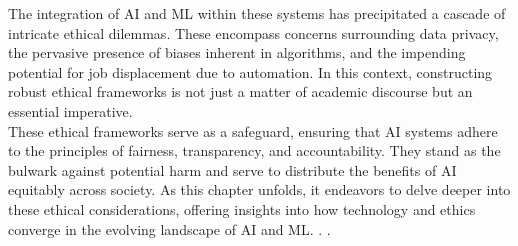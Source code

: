 \documentclass[12pt,a4paper,openright,twoside]{book}
\begin{document}
The integration of AI and ML within these systems has precipitated a cascade of intricate ethical dilemmas. These encompass concerns surrounding data privacy, the pervasive presence of biases inherent in algorithms, and the impending potential for job displacement due to automation. In this context, constructing robust ethical frameworks is not just a matter of academic discourse but an essential imperative. \\
These ethical frameworks serve as a safeguard, ensuring that AI systems adhere to the principles of fairness, transparency, and accountability. They stand as the bulwark against potential harm and serve to distribute the benefits of AI equitably across society. As this chapter unfolds, it endeavors to delve deeper into these ethical considerations, offering insights into how technology and ethics converge in the evolving landscape of AI and ML. \cite{GRUETZEMACHER202210288}. \cite{GRUETZEMACHER202210288}.

\newpage
\end{document}
